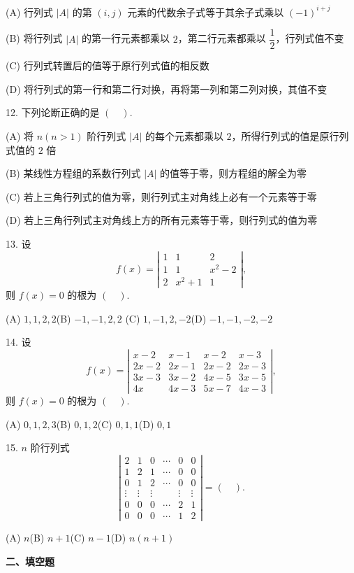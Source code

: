 \documentclass[UTF8,12pt,a4paper,fontset=fandol]{ctexart}
\begin{document}
(A) 行列式 $|A|$ 的第 $(i,j)$ 元素的代数余子式等于其余子式乘以 $(-1)^{i+j}$

(B) 将行列式 $|A|$ 的第一行元素都乘以 $2$，第二行元素都乘以 $\dfrac12$，行列式值不变

(C) 行列式转置后的值等于原行列式值的相反数

(D) 将行列式的第一行和第二行对换，再将第一列和第二列对换，其值不变

12. 下列论断正确的是 $(\quad)$.

(A) 将 $n(n>1)$ 阶行列式 $|A|$ 的每个元素都乘以 $2$，所得行列式的值是原行列式值的 $2$ 倍

(B) 某线性方程组的系数行列式 $|A|$ 的值等于零，则方程组的解全为零

(C) 若上三角行列式的值为零，则行列式主对角线上必有一个元素等于零

(D) 若上三角行列式主对角线上方的所有元素等于零，则行列式的值为零

13. 设
\[
f(x)=\left|\begin{array}{ccc}
1&1&2\\
1&1&x^2-2\\
2&x^2+1&1
\end{array}\right|,
\]
则 $f(x)=0$ 的根为 $(\quad)$.

(A) $1,1,2,2$\qquad (B) $-1,-1,2,2$\qquad
(C) $1,-1,2,-2$\qquad (D) $-1,-1,-2,-2$

14. 设
\[
f(x)=\left|\begin{array}{cccc}
x-2&x-1&x-2&x-3\\
2x-2&2x-1&2x-2&2x-3\\
3x-3&3x-2&4x-5&3x-5\\
4x&4x-3&5x-7&4x-3
\end{array}\right|,
\]
则 $f(x)=0$ 的根为 $(\quad)$.

(A) $0,1,2,3$\qquad (B) $0,1,2$\qquad (C) $0,1,1$\qquad (D) $0,1$

15. $n$ 阶行列式
\[
\left|\begin{array}{cccccc}
2&1&0&\cdots&0&0\\
1&2&1&\cdots&0&0\\
0&1&2&\cdots&0&0\\
\vdots&\vdots&\vdots&&\vdots&\vdots\\
0&0&0&\cdots&2&1\\
0&0&0&\cdots&1&2
\end{array}\right|=(\quad).
\]

(A) $n$\qquad (B) $n+1$\qquad (C) $n-1$\qquad (D) $n(n+1)$

\noindent\textbf{二、填空题}
\end{document}
